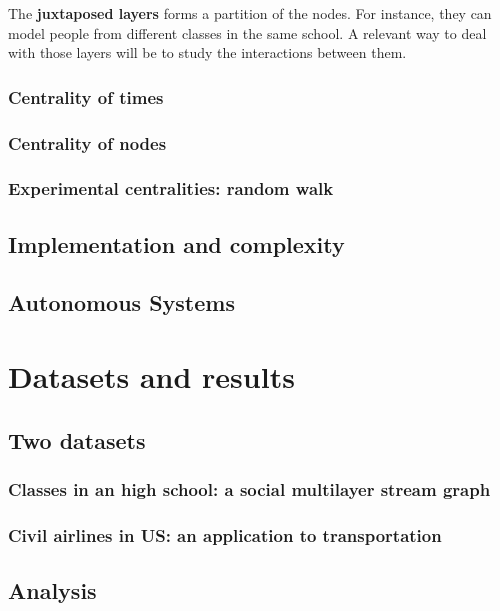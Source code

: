 \documentclass{svproc}
\begin{document}
The {\bf juxtaposed layers} forms a partition of the nodes. For instance, they can model people from different classes in the same school. A relevant way to deal with those layers will be to study the interactions between them.

\subsubsection{Centrality of times}
%
\subsubsection{Centrality of nodes}
%
\subsubsection{Experimental centralities: random walk}
%

\subsection{Implementation and complexity}
%
\subsection{Autonomous Systems}
%

\section{Datasets and results}
%
\subsection{Two datasets}
%
\subsubsection{Classes in an high school: a social multilayer stream graph}
%
\subsubsection{Civil airlines in US: an application to transportation}
%
\subsection{Analysis}
%
\end{document}
